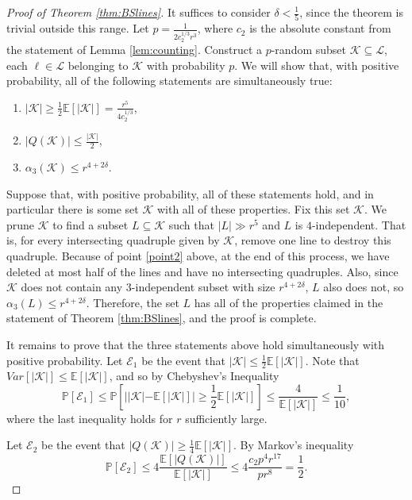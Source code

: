 \documentclass[11pt]{amsart}
\newcommand{\cK}{\mathcal{K}}
\newcommand{\cL}{\mathcal{L}}
\theoremstyle{remark}
\begin{document}
\begin{proof}[Proof of Theorem \ref{thm:BSlines}]

It suffices to consider $\delta < \frac{1}{5}$, since the theorem is trivial outside this range. Let $p=\frac{1}{2c_2^{1/3}r^3}$, where $c_2$ is the absolute constant from the statement of Lemma \ref{lem:counting}. Construct a $p$-random subset $\cK \subseteq \cL$, each $\ell \in \cL$ belonging to $\cK$ with probability $p$. We will show that, with positive probability, all of the following statements are simultaneously true:
 \begin{enumerate}
 \item $|\cK| \geq \frac{1}{2} \mathbb E[|\cK|]=\frac{r^5}{4c_2^{1/3}}$,
     \item $|Q(\cK)| \leq\frac{|\cK|}{2}$, \label{point2}
     \item $\alpha_3(\cK) \leq r^{4+2\delta}$.
 \end{enumerate}
 
 Suppose that, with positive probability, all of these statements hold, and in particular there is some set $\cK$ with all of these properties. Fix this set $\cK$. We prune $\cK$ to find a subset $L \subseteq \cK$ such that $|L| \gg r^5$ and $L$ is $4$-independent. That is, for every intersecting quadruple given by $\cK$, remove one line to destroy this quadruple. Because of point \eqref{point2} above, at the end of this process, we have deleted at most half of the lines and have no intersecting quadruples. Also, since $\cK$ does not contain any $3$-independent subset with size $r^{4 +2\delta}$, $L$ also does not, so $\alpha_3(L) \leq r^{4+2\delta}$. Therefore, the set $L$ has all of the properties claimed in the statement of Theorem \ref{thm:BSlines}, and the proof is complete.

  It remains to prove that the three statements above hold simultaneously with positive probability. Let $\mathcal E_1$ be the event that $|\cK| \leq \frac{1}{2}\mathbb E[|\cK|]$. Note that $Var[|\cK|] \leq \mathbb E[|\cK|]$, and so by Chebyshev's Inequality
 \[
 \mathbb P[\mathcal E_1] \leq \mathbb P\left [ | |\cK| - \mathbb E[|\cK|] | \geq\frac{1}{2} \mathbb  E[|\cK|] \right] \leq \frac{4}{\mathbb E[|\cK|]} \leq \frac{1}{10},
 \]
 where the last inequality holds for $r$ sufficiently large.

 Let $\mathcal E_2$ be the event that $|Q(\cK)| \geq \frac{1}{4} \mathbb E[|\cK|]$. By Markov's inequality
 \begin{equation} \label{mark1}
 \mathbb P [\mathcal E_2] \leq 4\frac{ \mathbb E [|Q(\cK)|]}{\mathbb E[|\cK|]}\leq 4\frac{ c_2p^4r^{17}}{pr^8}=\frac{1}{2}.
 \end{equation}


\end{proof}
\end{document}

